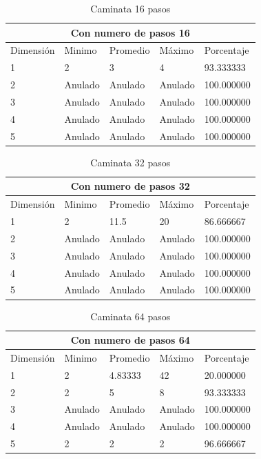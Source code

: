 \documentclass{article}
\begin{document}
\begin{table}[H]
\centering
\begin{tabular}{ |p{2cm}||p{2cm}|p{2cm}|p{2cm}|p{2cm  }|}
 \hline
 \multicolumn{5}{|c|}{Con numero de pasos 16} \\
 \hline
 Dimensión&Minimo&Promedio&Máximo&Porcentaje\\
 \hline
 1   & 2       & 3        & 4       & 93.333333\\
 2   & Anulado & Anulado  & Anulado & 100.000000\\
 3   & Anulado & Anulado  & Anulado & 100.000000\\
 4   & Anulado & Anulado  & Anulado & 100.000000\\
 5   & Anulado & Anulado  & Anulado & 100.000000\\
 \hline
\end{tabular}
\caption{Caminata 16 pasos}
\label{table:1}
\end{table}

\begin{table}[H]
\centering
\begin{tabular}{ |p{2cm}||p{2cm}|p{2cm}|p{2cm}|p{2cm  }|}
 \hline
 \multicolumn{5}{|c|}{Con numero de pasos 32} \\
 \hline
 Dimensión&Minimo&Promedio&Máximo&Porcentaje\\
 \hline
 1   & 2       & 11.5     & 20      & 86.666667\\
 2   & Anulado & Anulado  & Anulado & 100.000000\\
 3   & Anulado & Anulado  & Anulado & 100.000000\\
 4   & Anulado & Anulado  & Anulado & 100.000000\\
 5   & Anulado & Anulado  & Anulado & 100.000000\\
 \hline
\end{tabular}
\caption{Caminata 32 pasos}
\label{table:2}
\end{table}

\begin{table}[H]
\centering
\begin{tabular}{ |p{2cm}||p{2cm}|p{2cm}|p{2cm}|p{2cm  }|}
 \hline
 \multicolumn{5}{|c|}{Con numero de pasos 64} \\
 \hline
 Dimensión&Minimo&Promedio&Máximo&Porcentaje\\
 \hline
 1   & 2       & 4.83333  & 42      & 20.000000\\
 2   & 2       & 5        & 8       & 93.333333\\
 3   & Anulado & Anulado  & Anulado & 100.000000\\
 4   & Anulado & Anulado  & Anulado & 100.000000\\
 5   & 2       & 2        & 2       & 96.666667\\
 \hline
\end{tabular}
\caption{Caminata 64 pasos}
\label{table:3}
\end{table}
\end{document}
